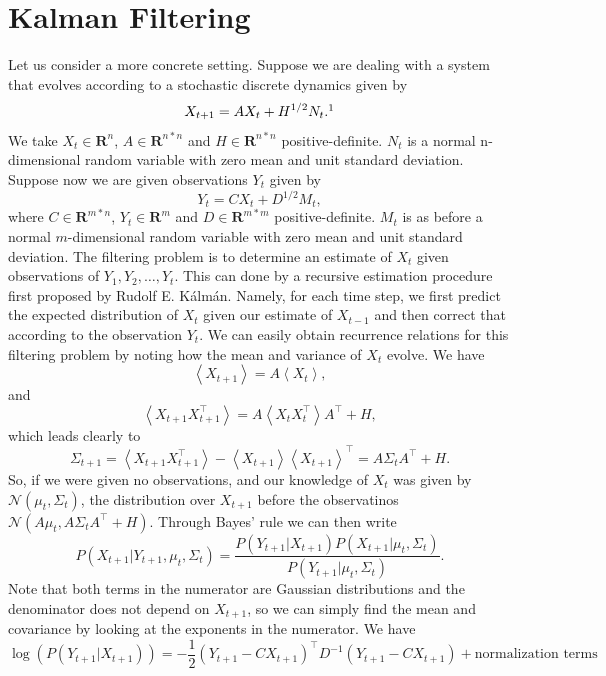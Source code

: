 \section{Kalman Filtering}
\label{sec:kalman}
Let us consider a more concrete setting. Suppose we are dealing with a system that evolves according to a stochastic discrete dynamics given by
\[
X_{t+1} = A X_{t} + H^{1/2} N_t.\footnotemark
\]
We take $X_t \in \mathbf{R}^n$, $A\in \mathbf{R}^{n*n}$ and $H \in \mathbf{R}^{n*n}$ positive-definite. $N_t$ is a normal n-dimensional random variable with zero mean and unit standard deviation. Suppose now we are given observations $Y_t$ given by
\[
Y_t = C X_t + D^{1/2} M_t,
\]
where $C \in \mathbf{R}^{m*n}$, $Y_t \in \mathbf{R}^m$ and $D\in \mathbf{R}^{m*m}$ positive-definite. $M_t$ is as before a normal $m$-dimensional random variable with zero mean and unit standard deviation. The filtering problem is to determine an estimate of $X_t$ given observations of $Y_1,Y_2,\ldots,Y_t$. This can done by a recursive estimation procedure first proposed by Rudolf E. K\'alm\'an. Namely, for each time step, we first predict the expected distribution of $X_t$ given our estimate of $X_{t-1}$ and then correct that according to the observation $Y_t$. We can easily obtain recurrence relations for this filtering problem by noting how the mean and variance of $X_t$ evolve. We have
\[
\left<X_{t+1}\right> = A\left<X_t\right>,
\]
and
\[
\left<X_{t+1}X_{t+1}^\top\right> = A\left<X_tX_t^\top\right>A^\top + H,
\]
which leads clearly to
\[
\Sigma_{t+1} = \left<X_{t+1}X_{t+1}^\top\right> - \left<X_{t+1}\right>\left<X_{t+1}\right>^\top = A\Sigma_tA^\top +H.
\]
So, if we were given no observations, and our knowledge of $X_t$ was given by $\mathcal{N}(\mu_t,\Sigma_t)$, the distribution over $X_{t+1}$ before the observatinos $\mathcal{N}(A\mu_t,A\Sigma_tA^\top+H)$. Through Bayes' rule we can then write
\[
P(X_{t+1}| Y_{t+1}, \mu_t,\Sigma_t) =\frac{P(Y_{t+1}|X_{t+1})P(X_{t+1}|\mu_t,\Sigma_t)}{P(Y_{t+1}|\mu_t,\Sigma_t)}.
\]
Note that both terms in the numerator are Gaussian distributions and the denominator does not depend on $X_{t+1}$, so we can simply find the mean and covariance by looking at the exponents in the numerator. We have
\[
\log( P(Y_{t+1}|X_{t+1})) = -\frac{1}{2}( Y_{t+1} - C X_{t+1})^\top D^{-1}(Y_{t+1}-C X_{t+1}) + \textrm{normalization terms}
\]
